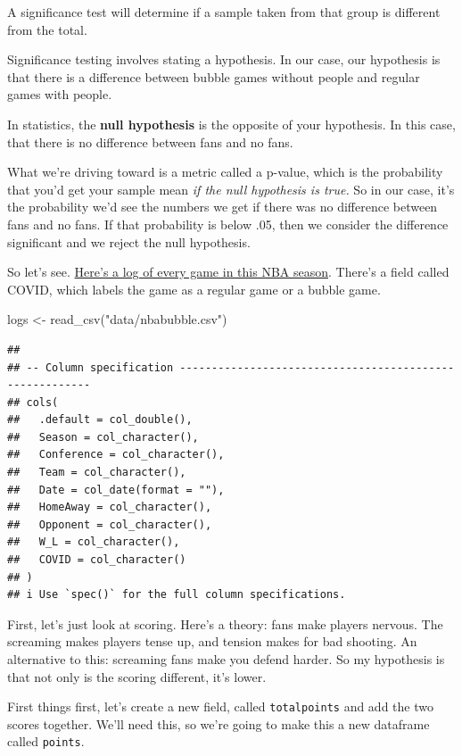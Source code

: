 \documentclass[
]{book}
\newenvironment{Shaded}{\begin{snugshade}}{\end{snugshade}}
\newcommand{\FunctionTok}[1]{\textcolor[rgb]{0.00,0.00,0.00}{#1}}
\newcommand{\NormalTok}[1]{#1}
\newcommand{\OtherTok}[1]{\textcolor[rgb]{0.56,0.35,0.01}{#1}}
\newcommand{\StringTok}[1]{\textcolor[rgb]{0.31,0.60,0.02}{#1}}
\begin{document}
A significance test will determine if a sample taken from that group is different from the total.

Significance testing involves stating a hypothesis. In our case, our hypothesis is that there is a difference between bubble games without people and regular games with people.

In statistics, the \textbf{null hypothesis} is the opposite of your hypothesis. In this case, that there is no difference between fans and no fans.

What we're driving toward is a metric called a p-value, which is the probability that you'd get your sample mean \emph{if the null hypothesis is true.} So in our case, it's the probability we'd see the numbers we get if there was no difference between fans and no fans. If that probability is below .05, then we consider the difference significant and we reject the null hypothesis.

So let's see. \href{https://unl.box.com/s/ifhuz3t0b7rbk0u8hr52b17klvqv8lxo}{Here's a log of every game in this NBA season}. There's a field called COVID, which labels the game as a regular game or a bubble game.

\begin{Shaded}
\begin{Highlighting}[]
\NormalTok{logs }\OtherTok{\textless{}{-}} \FunctionTok{read\_csv}\NormalTok{(}\StringTok{"data/nbabubble.csv"}\NormalTok{)}
\end{Highlighting}
\end{Shaded}

\begin{verbatim}
## 
## -- Column specification --------------------------------------------------------
## cols(
##   .default = col_double(),
##   Season = col_character(),
##   Conference = col_character(),
##   Team = col_character(),
##   Date = col_date(format = ""),
##   HomeAway = col_character(),
##   Opponent = col_character(),
##   W_L = col_character(),
##   COVID = col_character()
## )
## i Use `spec()` for the full column specifications.
\end{verbatim}

First, let's just look at scoring. Here's a theory: fans make players nervous. The screaming makes players tense up, and tension makes for bad shooting. An alternative to this: screaming fans make you defend harder. So my hypothesis is that not only is the scoring different, it's lower.

First things first, let's create a new field, called \texttt{totalpoints} and add the two scores together. We'll need this, so we're going to make this a new dataframe called \texttt{points}.
\end{document}
